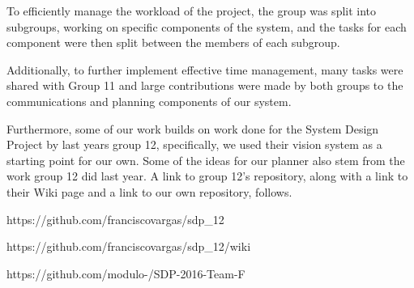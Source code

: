 ﻿\documentclass[12pt,a4paper,titlepage]{article}
\begin{document}
To efficiently manage the workload of the project, the group was split into subgroups, working on specific components of the system, and the tasks for each component were then split between the members of each subgroup. 

Additionally, to further implement effective time management, many tasks were shared with Group 11 and large contributions were made by both groups to the communications and planning components of our system.

Furthermore, some of our work builds on work done for the System Design Project by last years group 12, specifically, we used their vision system as a starting point for our own. Some of the ideas for our planner also stem from the work group 12 did last year.
A link to group 12's repository, along with a link to their Wiki page and a link to our own repository, follows.

https://github.com/franciscovargas/sdp_12

https://github.com/franciscovargas/sdp_12/wiki

https://github.com/modulo-/SDP-2016-Team-F

%
%
%
%
%
\end{document}
